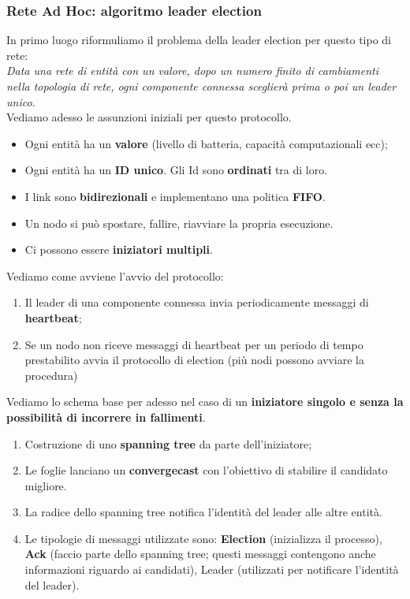 \documentclass[12pt]{article}
\begin{document}
		\subsubsection{Rete Ad Hoc: algoritmo leader election}
			In primo luogo riformuliamo il problema della leader election per questo tipo di rete:\\
			\textit{Data una rete di entità con un valore, dopo un numero finito di cambiamenti nella topologia di rete, ogni componente connessa sceglierà prima o poi un leader unico.}\\
			Vediamo adesso le assunzioni iniziali per questo protocollo.
			\begin{itemize}
				\item Ogni entità ha un \textbf{valore} (livello di batteria, capacità computazionali ecc);
				\item Ogni entità ha un \textbf{ID unico}. Gli Id sono \textbf{ordinati} tra di loro.
				\item I link sono \textbf{bidirezionali} e implementano una politica \textbf{FIFO}.
				\item Un nodo si può spostare, fallire, riavviare la propria esecuzione.
				\item Ci possono essere \textbf{iniziatori multipli}.
			\end{itemize}
			Vediamo come avviene l'avvio del protocollo:
			\begin{enumerate}
				\item Il leader di una componente connessa invia periodicamente messaggi di \textbf{heartbeat};
				\item Se un nodo non riceve messaggi di heartbeat per un periodo di tempo prestabilito avvia il protocollo di election (più nodi possono avviare la procedura)
			\end{enumerate}
			Vediamo lo schema base per adesso nel caso di un \textbf{iniziatore singolo e senza la possibilità di incorrere in fallimenti}.
			\begin{enumerate}
				\item Costruzione di uno \textbf{spanning tree} da parte dell'iniziatore;
				\item Le foglie lanciano un \textbf{convergecast} con l'obiettivo di stabilire il candidato migliore.
				\item La radice dello spanning tree notifica l'identità del leader alle altre entità.
				\item Le tipologie di messaggi utilizzate sono: \textbf{Election} (inizializza il processo), \textbf{Ack} (faccio parte dello spanning tree; questi messaggi contengono anche informazioni riguardo ai candidati), Leader (utilizzati per notificare l'identità del leader).
			\end{enumerate}
\end{document}
